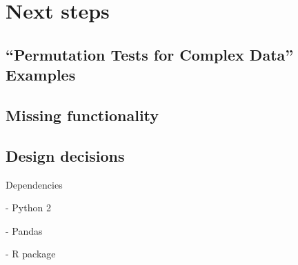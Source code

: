 \chapter{Next steps}

\section{``Permutation Tests for Complex Data'' Examples}

\cite{pesarin2010permutation}

\section{Missing functionality}

\section{Design decisions}

Dependencies

- Python 2

- Pandas

- R package



